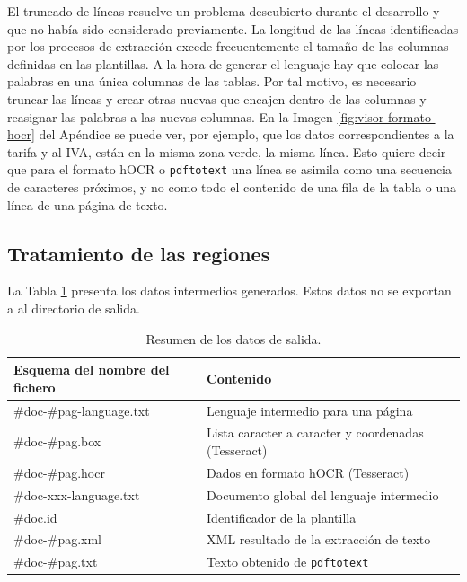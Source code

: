 El truncado de líneas resuelve un problema descubierto durante el desarrollo y que no había sido considerado previamente. La longitud de las líneas identificadas por los procesos de extracción excede frecuentemente el tamaño de las columnas definidas en las plantillas. A la hora de generar el lenguaje hay que colocar las palabras en una única columnas de las tablas. Por tal motivo, es necesario truncar las líneas y crear otras nuevas que encajen dentro de las columnas y reasignar las palabras a las nuevas columnas. En la Imagen \ref{fig:visor-formato-hocr} del Apéndice se puede ver, por ejemplo, que los datos correspondientes a la tarifa y al IVA, están en la misma zona verde, la misma línea. Esto quiere decir que para el formato hOCR o \verb|pdftotext| una línea se asimila como una secuencia de caracteres próximos, y no como todo el contenido de una fila de la tabla o una línea de una página de texto.


\subsection{Tratamiento de las regiones}






La Tabla \ref{tab:datos-intermedios} presenta los datos intermedios generados. Estos datos no se exportan a al directorio de salida.

\begin{table}[ht]
    \centering
    \begin{tabular}{l l}
        Esquema del nombre del fichero & Contenido \\
        \hline
        \hline
        \#doc-\#pag-language.txt & Lenguaje intermedio para una página \\
        \#doc-\#pag.box & Lista caracter a caracter y coordenadas (Tesseract) \\
        \#doc-\#pag.hocr & Dados en formato hOCR (Tesseract) \\
        \#doc-xxx-language.txt & Documento global del lenguaje intermedio \\
        \#doc.id & Identificador de la plantilla \\
        \#doc-\#pag.xml & XML resultado de la extracción de texto \\
        \#doc-\#pag.txt & Texto obtenido de \verb|pdftotext| \\
    \end{tabular}
    \caption{Resumen de los datos de salida.}    
    \label{tab:datos-intermedios}
\end{table}

